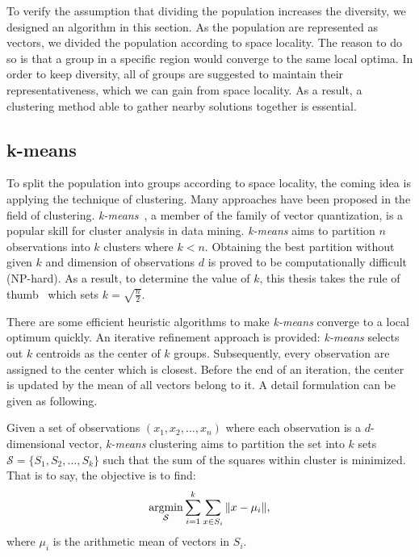 To verify the assumption that dividing the population increases the
diversity, we designed an algorithm in this section. 
As the population are represented as vectors, we divided the population
according to space locality.
The reason to do so is that a group in a specific region would converge
to the same local optima.
In order to keep diversity, all of groups are suggested to maintain
their representativeness, which we can gain from space locality.
As a result, a clustering method able to gather nearby solutions
together is essential.

\subsection{k-means}

To split the population into groups according to space locality, the
coming idea is applying the technique of clustering.
Many approaches have been proposed in the field of clustering.
\emph{k-means}~\cite{hartigan1979algorithm}, a member of the family of vector quantization, is a
popular skill for cluster analysis in data mining.
\emph{k-means} aims to partition $n$ observations into $k$ clusters
where $k < n $.
Obtaining the best partition without given $k$ and dimension of
observations $d$ is proved to be computationally difficult (NP-hard).
As a result, to determine the value of $k$, this thesis takes the rule
of thumb~\cite{kmeansruleofthumb} which sets $k = \sqrt{\frac{n}{2}}$.

There are some efficient heuristic algorithms to make \emph{k-means}
converge to a local optimum quickly.
An iterative refinement approach is provided: \emph{k-means} selects
out $k$ centroids as the center of $k$ groups.
Subsequently, every observation are assigned to the center which is closest.
Before the end of an iteration, the center is updated by the mean of all vectors
belong to it.
A detail formulation can be given as following.

Given a set of observations $\left( x_1, x_2, \ldots, x_n\right)$ where each
observation is a $d$-dimensional vector, \emph{k-means} clustering aims to
partition the set into $k$ sets $\mathcal{S} = \{ S_1, S_2, \ldots, S_k \}$ such
that the sum of the squares within cluster is minimized.
That is to say, the objective is to find:
\[\argmin_{\mathcal{S}}\sum\limits_{i=1}^k \sum\limits_{x \in S_i}
\|x-\mu_i\|,\] where $\mu_i$ is the arithmetic mean of vectors in $S_i$.

